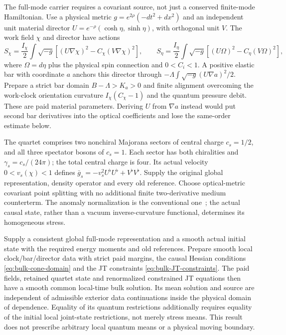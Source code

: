 The full-mode carrier requires a covariant source, not just a conserved
finite-mode Hamiltonian. Use a physical metric $g=e^{2\rho}(-dt^2+dx^2)$
and an independent unit material director
$U=e^{-\rho}(\cosh\eta,\sinh\eta)$, with orthogonal unit $V$.
The work field $\chi$ and director have actions
\begin{equation}
 S_\chi=\frac{I_\chi}{2}\int\sqrt{-g}
       [(U\nabla\chi)^2-C_\chi(V\nabla\chi)^2],\qquad
 S_\eta=\frac{I_\eta}{2}\int\sqrt{-g}
       [(U\Omega)^2-C_\eta(V\Omega)^2],                     \label{eq:bulk-paid-fields}
\end{equation}
where $\Omega=d\eta$ plus the physical spin connection and $0<C_i<1$.
A positive elastic bar with coordinate $a$ anchors this director through
$-\Lambda\int\sqrt{-g}(U\nabla a)^2/2$.
Prepare a strict bar domain $B-\Lambda>K_a>0$ and finite alignment
overcoming the work-clock orientation curvature
$I_\chi(C_\chi-1)$ and the quantum pressure debit. These are paid
material parameters. Deriving $U$ from $\nabla a$ instead would put
second bar derivatives into the optical coefficients and lose the
same-order estimate below.

The quartet comprises two nonchiral Majorana sectors of central charge
$c_s=1/2$, and all three spectator bosons of $c_s=1$. Each sector has
both chiralities and $\gamma_s=c_s/(24\pi)$; the total central charge
is four. Its actual velocity $0<v_s(\chi)<1$ defines
$\bar g_s=-v_s^2U^\flat U^\flat+V^\flat V^\flat$.
Supply the original global representation, density operator and every
old reference. Choose optical-metric covariant point splitting with no
additional finite two-derivative medium counterterm. The anomaly
normalization is the conventional one~\cite[Section~2]{Codello2010};
the actual causal state, rather than a vacuum inverse-curvature
functional, determines its homogeneous stress.

\begin{proposition}
\label{prop:covariant-quartet-bulk}
Supply a consistent global full-mode representation and a smooth actual
initial state with the required energy moments and old references.
Prepare smooth local clock/bar/director data with strict paid margins,
the causal Hessian conditions \eqref{eq:bulk-cone-domain} and the JT
constraints \eqref{eq:bulk-JT-constraints}. The paid fields, retained
quartet state and renormalized constrained JT equations then have a
smooth common local-time bulk solution. Its mean solution and source
are independent of admissible exterior data continuations inside the
physical domain of dependence. Equality of its quantum restrictions
additionally requires equality of the initial local joint-state
restrictions, not merely stress means. This result does not prescribe
arbitrary local quantum means or a physical moving boundary.
\end{proposition}

